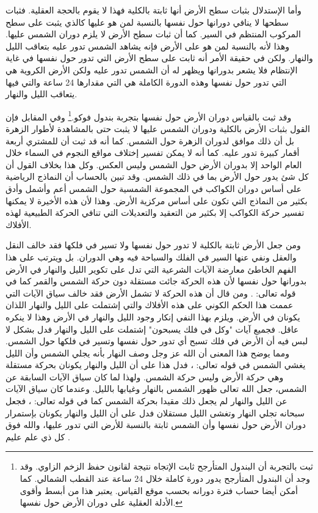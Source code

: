وأما الإستدلال بثبات سطح الأرض أنها ثابتة بالكلية فهذا لا يقوم بالحجة العقلية. فثبات سطحها لا ينافي دورانها حول نفسها بالنسبة لمن هو عليها كالذي يثبت على سطح المركوب المنتظم في السير. كما أن ثبات سطح الأرض لا يلزم دوران الشمس عليها. وهذا لأنه بالنسبة لمن هو على الأرض فإنه يشاهد الشمس تدور عليه بتعاقب الليل والنهار. ولكن في حقيقة الأمر أنه ثابت على سطح الأرض التي تدور حول نفسها في غاية الإنتظام فلا يشعر بدورانها ويظهر له أن الشمس تدور عليه ولكن الأرض الكروية هي التي تدور حول نفسها وهذه الدورة الكاملة هي التي مقدارها 24 ساعة والتي فيها يتعاقب الليل والنهار. 

وقد ثبت بالقياس دوران الأرض حول نفسها بتجربة بندول فوكو.\footnote{ثبت بالتجربة أن البندول المتأرجح ثابت الإتجاه نتيجة لقانون حفظ الزخم الزاوي. وقد وجد أن البندول المتأرجح يدور دورة كاملة خلال 24 ساعة عند القطب الشمالي. كما أمكن أيضا حساب فترة دورانه بحسب موقع القياس. يعتبر هذا من أبسط وأقوى الأدلة العقلية على دوران الأرض حول نفسها.} وفي المقابل فإن القول بثبات الأرض بالكلية ودوران الشمس عليها لا يثبت حتى بالمشاهدة لأطوار الزهرة بل أن ذلك موافق لدوران الزهرة حول الشمس. كما أنه قد ثبت أن للمشتري أربعة أقمار كبيرة تدور عليه. كما أنه لا يمكن تفسير إختلاف مواقع النجوم في السماء خلال العام الواحد إلا بدوران الأرض حول الشمس وليس العكس. وكل هذا بخلاف القول أن كل شئ يدور حول الأرض بما في ذلك الشمس. وقد تبين بالحساب أن النماذج الرياضية على أساس دوران الكواكب في المجموعة الشمسية حول الشمس أعم وأشمل وأدق بكثير من النماذج التي تكون على أساس مركزية الأرض. وهذا لأن هذه الأخيرة لا يمكنها تفسير حركة الكواكب إلا بكثير من التعقيد والتعديلات التي تنافي الحركة الطبيعية لهذه الأفلاك.

ومن جعل الأرض ثابتة بالكلية لا تدور حول نفسها ولا تسير في فلكها فقد خالف النقل والعقل ونفي عنها السير  في الفلك والسباحة فيه وهي الدوران. بل ويترتب على هذا الفهم الخاطئ معارضة الآيات الشرعية التي تدل على تكوير الليل والنهار في الأرض بدورانها حول نفسها لأن هذه الحركة جائت مستقلة دون حركة الشمس والقمر كما في قوله تعالى: \quranayah*[21][33]{\footnotesize \surahname*[21]}\comment{\quranayah*[36][40]{\footnotesize (\surahname*[36])}}. ومن قال أن هذه الحركة لا تشمل الأرض فقد خالف سياق الآيات التي عممت هذا الحكم الكوني على هذه الأفلاك والتي إشتملت على الليل والنهار اللذان يكونان في الأرض. ويلزم بهذا النفي إنكار وجود الليل والنهار في الأرض وهذا لا ينكره عاقل. فجميع آيات "وكل في فلك يسبحون" إشتملت على الليل والنهار فدل بشكل لا لبس فيه أن الأرض في فلك تسبح أي تدور حول نفسها وتسير في فلكها حول الشمس. ومما يوضح هذا المعنى أن الله عز وجل وصف النهار بأنه يجلي الشمس وأن الليل يغشي الشمس في قوله تعالى: \quranayah*[91][1-4]{\footnotesize \surahname*[91]}، فدل هذا على أن الليل والنهار يكونان بحركة مستقلة وهي حركة الأرض وليس حركة الشمس. ولهذا لما كان سياق الآيات السابقة عن الشمس، جعل الله تعالى ظهور الشمس بالنهار وغيابها بالليل. وعندما كان سياق الآيات عن الليل والنهار لم يجعل ذلك مقيدا بحركة الشمس كما في قوله تعالى: \quranayah*[92][1-2]{\footnotesize \surahname*[92]}، فجعل سبحانه تجلي النهار وتغشى الليل مستقلان فدل على أن الليل والنهار يكونان بإستمرار دوران الأرض حول نفسها وأن الشمس ثابتة بالنسبة للأرض التي تدور عليها، والله فوق كل ذي علم عليم \href{https://www.youtube.com/watch?v=GnZ3dogED7w}{\faExternalLink}.

